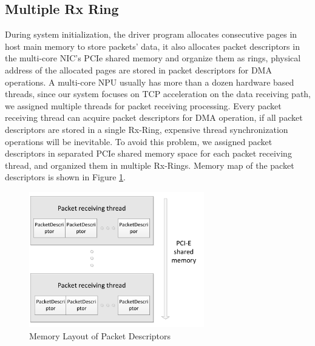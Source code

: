 \documentclass[conference]{IEEEtran}
\begin{document}
\subsection{Multiple Rx Ring}
During system initialization, the driver program allocates consecutive pages in host main memory to store packets' data, it also allocates packet descriptors in the multi-core NIC's PCIe shared memory and organize them as rings, physical address of the allocated pages are stored in packet descriptors for DMA operations. A multi-core NPU usually has more than a dozen hardware based threads, since our system focuses on TCP acceleration on the data receiving path, we assigned multiple threads for packet receiving processing. Every packet receiving thread can acquire packet descriptors for DMA operation, if all packet descriptors are stored in a single Rx-Ring, expensive thread synchronization operations will be inevitable. To avoid this problem, we assigned packet descriptors in separated PCIe shared memory space for each packet receiving thread, and organized them in multiple Rx-Rings. Memory map of the packet descriptors is shown in Figure \ref{packet descriptor}.
\begin{figure}[!t]
\centering
\includegraphics[width=3.0in]{packet_descriptor}
\caption{Memory Layout of Packet Descriptors}
\label{packet descriptor}
\end{figure}
\end{document}
